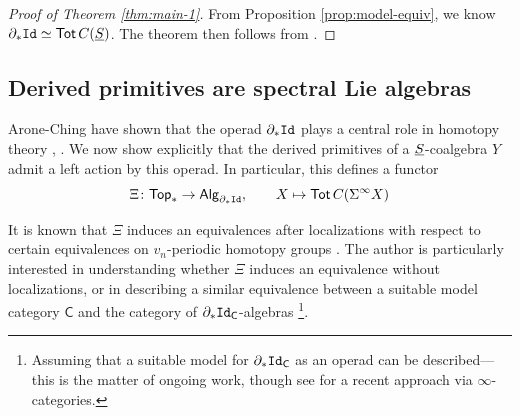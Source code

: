 \begin{proof}[Proof of Theorem \ref{thm:main-1}]
    From Proposition \ref{prop:model-equiv}, we know $\partial_* \mathtt{Id} \simeq \operatorname{\mathsf{Tot}} C(\underline{S})$. The theorem then follows from \cite[Poroposition 5.9]{Clark-1}.
\end{proof}

\subsection{Derived primitives are spectral Lie algebras}
Arone-Ching have shown that the operad $\partial_*\mathtt{Id}$ plays a central role in homotopy theory \cite{AC-coalg}, \cite{AC-2}. We now show explicitly that the derived primitives of a $\underline{S}$-coalgebra $Y$ admit a left action by this operad. In particular, this defines a functor \[ \Xi \colon \mathsf{Top}_* \to \mathsf{Alg}_{\partial_*\mathtt{Id}}, \quad \quad X\mapsto \operatorname{\mathsf{Tot}} C(\Sigma^{\infty} X)\]

It is known that $\Xi$ induces an equivalences after localizations with respect to certain equivalences on $v_n$-periodic homotopy groups \cite{Heuts-vn}. The author is particularly interested in understanding whether $\Xi$ induces an equivalence without localizations, or in describing a similar equivalence between a suitable model category $\mathsf{C}$ and the category of $\partial_*\mathtt{Id}_{\mathsf{C}}$-algebras \footnote{Assuming that a suitable model for $\partial_*\mathtt{Id}_{\mathsf{C}}$ as an operad can be described---this is the matter of ongoing work, though see \cite{Ching-day-conv} for a recent approach via $\infty$-categories.}.



